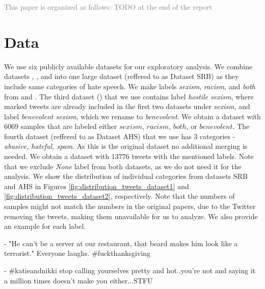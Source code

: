 \documentclass[fleqn,moreauthors,10pt]{ds_report}
\newcommand\bm{0.2pt}
\begin{document}
\textcolor{gray}{This paper is organized as follows: TODO at the end of the report}

\section*{Data}

We use six publicly available datasets for our exploratory analysis. We combine datasets \cite{waseem2016you}, \cite{rizoiu2019transfer}, and \cite{jha2017does} into one large dataset (reffered to as Dataset SRB) as they include same categories of hate speech. We make labels \textit{sexism}, \textit{racism}, and \textit{both} from \cite{waseem2016you} and \cite{rizoiu2019transfer}. The third dataset (\cite{jha2017does}) that we use contains label \textit{hostile sexism}, where marked tweets are already included in the first two datasets under \textit{sexism}, and label \textit{benevolent sexism}, which we rename to \textit{benevolent}. We obtain a dataset with $6069$ samples that are labeled either $sexism$, $racism$, $both$, or $benevolent$.
The fourth dataset (reffered to as Dataset AHS)\cite{founta2018large} that we use has $3$ categories - \textit{abusive,
hateful, spam}. As this is the original dataset no additional merging is needed. We obtain a dataset with $13776$ tweets with the mentioned labels. Note that we exclude \textit{None} label from both datasets, as we do not need it for the analysis.
We show the distribution of individual categories from datasets SRB and AHS in Figures \ref{fig:distribution_tweets_dataset1} and \ref{fig:distribution_tweets_dataset2}, respectively. Note that the numbers of samples might not match the numbers in the original papers, due to the Twitter removing the tweets, making them unavailable for us to analyze. We also provide an example for each label.

\begin{tcolorbox}[colback=black!8,width=0.9\linewidth, center,arc=8pt,sharp corners=downhill, boxrule=0.3pt, left=\bm, top=\bm, right=\bm, bottom=\bm, fontupper=\small]
 - "He can't be a server at our restaurant, that beard makes him look like a terrorist." Everyone laughs. \#fuckthanksgiving
\end{tcolorbox}

\begin{tcolorbox}[colback=black!8, width=0.9\linewidth, center,arc=8pt,sharp corners=downhill, boxrule=0.3pt, left=\bm, top=\bm, right=\bm, bottom=\bm, fontupper=\small]
 - \#katieandnikki stop calling yourselves pretty and hot..you're not and saying it a million times doesn't make you either...STFU
\end{tcolorbox}
\end{document}
